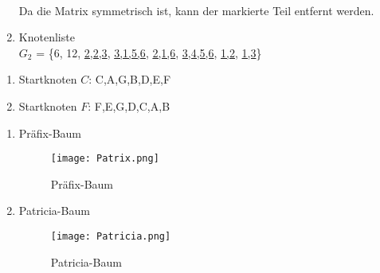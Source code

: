 \documentclass[12pt]{scrartcl}
\begin{document}
\begin{enumerate}
    \\Da die Matrix symmetrisch ist, kann der markierte Teil entfernt werden.

    \item Knotenliste\\
    $G_2$ = \{6, 12, \underline{2,2,3}, \underline{3,1,5,6}, \underline{2,1,6}, \underline{3,4,5,6}, \underline{1,2}, \underline{1,3}\}

\end{enumerate}

\begin{enumerate}
    \item Startknoten $C$: C,A,G,B,D,E,F
    \item Startknoten $F$: F,E,G,D,C,A,B
\end{enumerate}

    \begin{enumerate}
        \item Präfix-Baum
        \begin{figure}[!h]
            \centering
              \texttt{[image: Patrix.png]}
            \caption{Präfix-Baum}
          \end{figure}
        \item Patricia-Baum
        \begin{figure}[!h]
            \centering
              \texttt{[image: Patricia.png]}
            \caption{Patricia-Baum}
          \end{figure}
    \end{enumerate}
    
\end{document}
